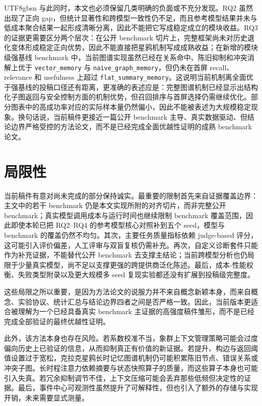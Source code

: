 \documentclass[a4paper,fleqn]{cas-sc}
\begin{document}
\begin{CJK*}{UTF8}{gbsn}
与此同时，本文也必须保留几类明确的负面或不充分发现。RQ2 虽然出现了正向 gap，但统计显著性和跨模型一致性仍不足，而且参考模型结果并未与低成本聚合结果一起形成清晰分离，因此不能把它写成稳定成立的模块收益。RQ3 的证据更需要区分两个层次：在公开 benchmark 切片上，完整框架尚未对历史退化变体形成稳定正向优势，因此不能直接把星鸦机制写成成熟收益；在新增的模块级强基线 benchmark 中，当前图谱实现虽然已经在关系命中、陈旧抑制和冲突消解上优于 \texttt{vector\_memory} 与 \texttt{naive\_graph\_memory}，但仍未在首屏 recall、relevance 和 usefulness 上超过 \texttt{flat\_summary\_memory}。这说明当前机制离全面优于强基线的投稿口径还有距离，更准确的表述应是：完整图谱机制已经显示出结构化子图返回与安全控制方面的机制优势，但召回排序与首屏选择仍需继续优化。部分图表中的高成功率对应的实际样本量仍然偏小，因此不能被表述为大规模稳定现象。换句话说，当前稿件更接近一篇公开 benchmark 主导、真实数据驱动、但结论边界严格受控的方法论文，而不是已经完成全面优越性证明的成熟 benchmark 论文。

\section{局限性}

当前稿件有意对尚未完成的部分保持诚实。最重要的限制首先来自证据覆盖边界：主文中的若干 benchmark 仍是本文实现所附的对齐切片，而非完整公开 benchmark；真实模型调用成本与运行时间也继续限制 benchmark 覆盖范围，因此即使本轮已把 RQ2--RQ4 的参考模型核心对照补到五个 seed，模型与 benchmark 的覆盖仍然不均匀。其次，主要任务质量指标依赖 judge-based 评分，这可能引入评价偏差，人工评审与双盲复核仍需补充。再次，自定义诊断套件只能作为补充证据，不能替代公开 benchmark 去支撑主结论；当前跨模型分析也仍局限于少量真实模型，尚不足以支撑更强的跨提供商泛化陈述。最后，成本-性能权衡、失败类型附录以及更大规模多 seed 复现实验都还没有扩展到投稿级完整度。

这些局限之所以重要，是因为方法论文的说服力并不来自概念新颖本身，而来自概念、实验协议、统计汇总与结论边界四者之间是否严格一致。因此，当前版本更适合被理解为一个已经具备真实 benchmark 主证据的高强度稿件雏形，而不是已经完成全部验证的最终优越性证明。

此外，该方法本身也存在风险。若系数校准不当，象群上下文管理策略可能会过度偏向历史上已验证的信息，从而抑制真正有价值的新证据。若提升、构边与返回阈值设置过于宽松，克拉克星鸦长时记忆图谱机制仍可能积累陈旧节点、错误关系或冲突子图。长时程注意力依赖摘要与状态快照算子的质量，而这些算子本身也可能引入失真。若冗余抑制调节不佳，上下文压缩可能会丢弃那些低频但决定性的证据。最后，事件中心可观测性虽然提升了可解释性，但也引入了额外的存储与实现开销，未来需要显式测量。


\end{CJK*}
\end{document}
